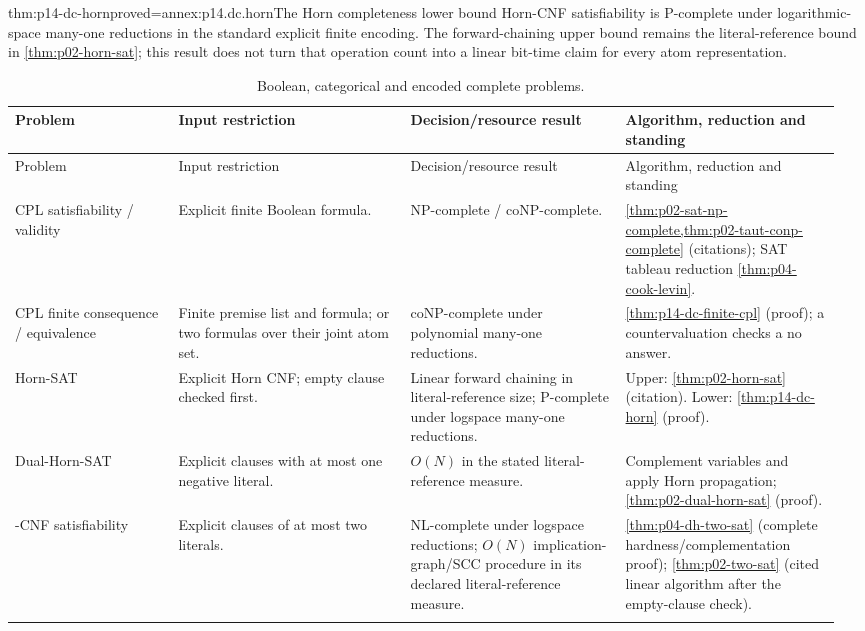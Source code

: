 \begin{hbtheorem}{thm:p14-dc-horn}{proved=annex:p14.dc.horn}{The Horn completeness lower bound}
Horn-CNF satisfiability is P-complete under logarithmic-space many-one
reductions in the standard explicit finite encoding. The forward-chaining
upper bound remains the literal-reference bound in
\cref{thm:p02-horn-sat}; this result does not turn that operation count into
a linear bit-time claim for every atom representation.
\end{hbtheorem}

\begin{landscape}
\begingroup\small\setlength{\tabcolsep}{3pt}
\begin{longtable}{@{}p{0.19\linewidth}p{0.27\linewidth}p{0.25\linewidth}p{0.25\linewidth}@{}}
\caption{Boolean, categorical and encoded complete problems.}\label{tab:p14-dc-boolean}\\
\toprule
Problem & Input restriction & Decision/resource result & Algorithm, reduction and standing\\\midrule
\endfirsthead
\toprule
Problem & Input restriction & Decision/resource result & Algorithm, reduction and standing\\\midrule
\endhead
\bottomrule
\endfoot
CPL satisfiability / validity & Explicit finite Boolean formula. & NP-complete / coNP-complete. & \cref{thm:p02-sat-np-complete,thm:p02-taut-conp-complete} (citations); SAT tableau reduction \cref{thm:p04-cook-levin}.\\\addlinespace
CPL finite consequence / equivalence & Finite premise list and formula; or two formulas over their joint atom set. & coNP-complete under polynomial many-one reductions. & \cref{thm:p14-dc-finite-cpl} (proof); a countervaluation checks a no answer.\\\addlinespace
Horn-SAT & Explicit Horn CNF; empty clause checked first. & Linear forward chaining in literal-reference size; P-complete under logspace many-one reductions. & Upper: \cref{thm:p02-horn-sat} (citation). Lower: \cref{thm:p14-dc-horn} (proof).\\\addlinespace
Dual-Horn-SAT & Explicit clauses with at most one negative literal. & \(O(N)\) in the stated literal-reference measure. & Complement variables and apply Horn propagation; \cref{thm:p02-dual-horn-sat} (proof).\\\addlinespace
2-CNF satisfiability & Explicit clauses of at most two literals. & NL-complete under logspace reductions; \(O(N)\) implication-graph/SCC procedure in its declared literal-reference measure. & \cref{thm:p04-dh-two-sat} (complete hardness/complementation proof); \cref{thm:p02-two-sat} (cited linear algorithm after the empty-clause check).\\\addlinespace

\end{longtable}
\end{landscape}
